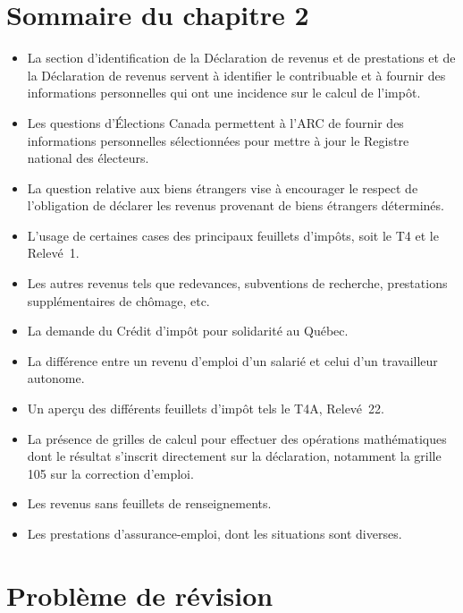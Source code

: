 \section{Sommaire du chapitre 2}
\begin{itemize}
	\item La section d'identification de la Déclaration de revenus et de prestations et de la Déclaration de revenus servent à identifier le contribuable et à fournir des informations personnelles qui ont une incidence sur le calcul de l'impôt.
	\item Les questions d'Élections Canada permettent à l'ARC de fournir des informations personnelles sélectionnées pour mettre à jour le Registre national des électeurs.
	\item La question relative aux biens étrangers vise à encourager le respect de l'obligation de déclarer les revenus provenant de biens étrangers déterminés.
	\item L'usage de certaines cases des principaux feuillets d'impôts, soit le T4 et le Relevé~1.
	\item Les autres revenus tels que redevances, subventions de recherche, prestations supplémentaires de chômage, etc.
	\item La demande du Crédit d'impôt pour solidarité au Québec.
	\item La différence entre un revenu d'emploi d'un salarié et celui d'un travailleur autonome.
	\item Un aperçu des différents feuillets d'impôt tels le T4A, Relevé~22.
	\item La présence de grilles de calcul pour effectuer des opérations mathématiques dont le résultat s'inscrit directement sur la déclaration, notamment la grille 105 sur la correction d'emploi.
	\item Les revenus sans feuillets de renseignements. 
	\item Les prestations d'assurance-emploi, dont les situations sont diverses.
\end{itemize}



\section{Problème de révision}
